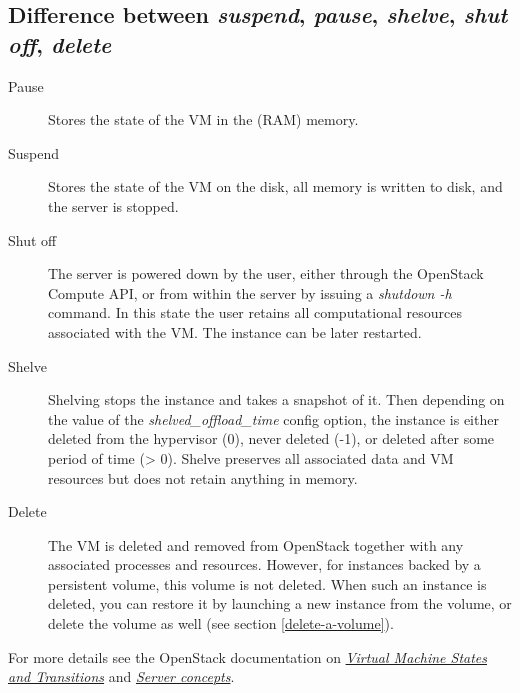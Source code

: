 \subsection*{Difference between \emph{suspend}, \emph{pause}, \emph{shelve}, \emph{shut off}, \emph{delete}}\label{server-power-down-states}

\begin{description}
\item[Pause] Stores the state of the VM in the (RAM) memory.
\item[Suspend] Stores the state of the VM on the disk, all memory is
  written to disk, and the server is stopped.
\item[Shut off] The server is powered down by the user, either through
  the OpenStack Compute API, or from within the server by issuing a
  \emph{shutdown -h} command. In this state the user retains all
  computational resources associated with the VM. The instance can be
  later restarted.
\item[Shelve] Shelving stops the instance and takes a snapshot of
  it. Then depending on the value of the \emph{shelved\_offload\_time}
  config option, the instance is either deleted from the hypervisor
  (0), never deleted (-1), or deleted after some period of time (>
  0). Shelve preserves all associated data and VM resources but does
  not retain anything in memory.
\item[Delete] The VM is deleted and removed from \gls{OpenStack}
  together with any associated processes and resources.  However, for
  instances backed by a persistent volume, this volume is not deleted.
  When such an instance is deleted, you can restore it by launching a
  new instance from the volume, or delete the volume as well (see
  section \ref{delete-a-volume}).
\end{description}

For more details see the OpenStack documentation on \href{https://docs.openstack.org/nova/\osversion/reference/vm-states.html}{\emph{Virtual Machine States and Transitions}} and \href{https://developer.openstack.org/api-guide/compute/server_concepts.html}{\emph{Server concepts}}.

